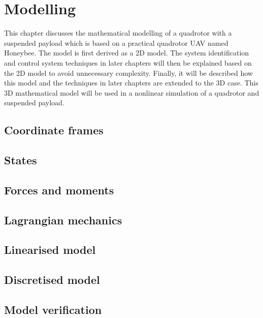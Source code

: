 \graphicspath{{modelling/fig/}}

\chapter{Modelling}
\label{chap:modelling}

This chapter discusses the mathematical modelling of a quadrotor with a suspended
payload which is based on a practical quadrotor UAV named Honeybee.
The model is first derived as a 2D model.
The system identification and control system techniques in later chapters will then be explained based on the 2D model to avoid unnecessary complexity.
Finally, it will be described how this model and the techniques in later chapters are extended to the 3D case.
This 3D mathematical model will be used in a nonlinear simulation of a quadrotor and suspended payload.

\section{Coordinate frames}
\section{States}
\section{Forces and moments}
\section{Lagrangian mechanics}
\section{Linearised model} \label{sec:linear_model}
\section{Discretised model}
\section{Model verification}


